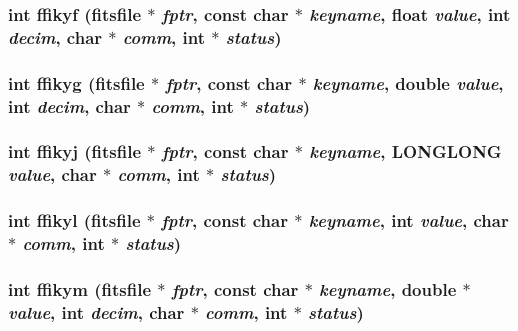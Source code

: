 \subsubsection{\setlength{\rightskip}{0pt plus 5cm}int ffikyf (\bf{fitsfile} $\ast$ {\em fptr}, const char $\ast$ {\em keyname}, float {\em value}, int {\em decim}, char $\ast$ {\em comm}, int $\ast$ {\em status})}\label{test_2roimasker_2fitsio_8h_ad8778b73662002f227e92cca425ce1a}


\subsubsection{\setlength{\rightskip}{0pt plus 5cm}int ffikyg (\bf{fitsfile} $\ast$ {\em fptr}, const char $\ast$ {\em keyname}, double {\em value}, int {\em decim}, char $\ast$ {\em comm}, int $\ast$ {\em status})}\label{test_2roimasker_2fitsio_8h_24996516801432718d31f7426d064006}


\subsubsection{\setlength{\rightskip}{0pt plus 5cm}int ffikyj (\bf{fitsfile} $\ast$ {\em fptr}, const char $\ast$ {\em keyname}, \bf{LONGLONG} {\em value}, char $\ast$ {\em comm}, int $\ast$ {\em status})}\label{test_2roimasker_2fitsio_8h_13613553fb1fc6a12fd7cd38c8d434bb}


\subsubsection{\setlength{\rightskip}{0pt plus 5cm}int ffikyl (\bf{fitsfile} $\ast$ {\em fptr}, const char $\ast$ {\em keyname}, int {\em value}, char $\ast$ {\em comm}, int $\ast$ {\em status})}\label{test_2roimasker_2fitsio_8h_a4ca40c0298931f7db20e3bc061dad32}


\subsubsection{\setlength{\rightskip}{0pt plus 5cm}int ffikym (\bf{fitsfile} $\ast$ {\em fptr}, const char $\ast$ {\em keyname}, double $\ast$ {\em value}, int {\em decim}, char $\ast$ {\em comm}, int $\ast$ {\em status})}\label{test_2roimasker_2fitsio_8h_304bdae48864568598985614f7d2fdac}


